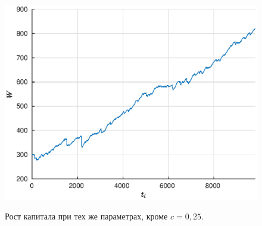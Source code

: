 \begin{figure}[b]
\noindent
        \centering
        {
        \includegraphics[width=120mm]{task_11/3up.eps}}
        \caption{Рост капитала при тех же параметрах, кроме $c = 0,\!25$.}
\end{figure}